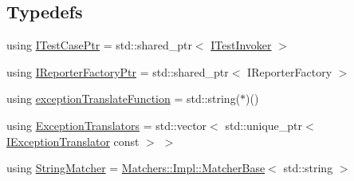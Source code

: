 \subsection*{Typedefs}
\begin{DoxyCompactItemize}
\item 
using \mbox{\hyperlink{namespace_catch_afa04ebe8e9423240c9585f7101a82ddf}{I\+Test\+Case\+Ptr}} = std\+::shared\+\_\+ptr$<$ \mbox{\hyperlink{struct_catch_1_1_i_test_invoker}{I\+Test\+Invoker}} $>$
\item 
using \mbox{\hyperlink{namespace_catch_ad1b36ac40c2739e52fd453dcdddf0d09}{I\+Reporter\+Factory\+Ptr}} = std\+::shared\+\_\+ptr$<$ I\+Reporter\+Factory $>$
\item 
using \mbox{\hyperlink{namespace_catch_ae8d8673884dc36b98875106322a2a37b}{exception\+Translate\+Function}} = std\+::string($\ast$)()
\item 
using \mbox{\hyperlink{namespace_catch_a7ad07967e688fdc03cf784f58be4b741}{Exception\+Translators}} = std\+::vector$<$ std\+::unique\+\_\+ptr$<$ \mbox{\hyperlink{struct_catch_1_1_i_exception_translator}{I\+Exception\+Translator}} const  $>$ $>$
\item 
using \mbox{\hyperlink{namespace_catch_aba438977e831821a2eeca82b9b4f4af2}{String\+Matcher}} = \mbox{\hyperlink{struct_catch_1_1_matchers_1_1_impl_1_1_matcher_base}{Matchers\+::\+Impl\+::\+Matcher\+Base}}$<$ std\+::string $>$
\end{DoxyCompactItemize}
